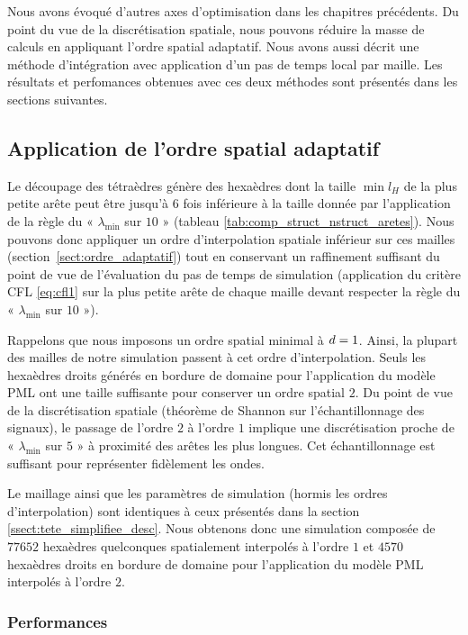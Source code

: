 Nous avons évoqué d'autres axes d'optimisation dans les chapitres précédents.
Du point du vue de la discrétisation spatiale, nous pouvons réduire la masse
de calculs en appliquant l'ordre spatial adaptatif.
Nous avons aussi décrit une méthode d'intégration avec application d'un pas de temps
local par maille.
Les résultats et perfomances obtenues avec ces deux méthodes sont
présentés dans les sections suivantes.



\subsection{Application de l'ordre spatial adaptatif}
\label{ssect:tete_simplifiee_adaptatif}

Le découpage des tétraèdres génère des hexaèdres dont la taille $\min l_H$
de la plus petite arête peut être jusqu'à $6$ fois inférieure à la taille
donnée par l'application de la règle du « $\lambda_{\min}$ sur $10$ »
(tableau \ref{tab:comp_struct_nstruct_aretes}).
Nous pouvons donc appliquer un ordre
d'interpolation spatiale inférieur sur ces mailles (section~\ref{sect:ordre_adaptatif})
tout en conservant
un raffinement suffisant du point de vue de l'évaluation du pas de temps
de simulation (application du critère CFL \eqref{eq:cfl1} sur la plus petite
arête de chaque maille devant respecter la règle du « $\lambda_{\min}$ sur $10$ »).

Rappelons que nous imposons un ordre spatial minimal à $d=1$. Ainsi,
la plupart des mailles de notre simulation passent à cet ordre d'interpolation.
Seuls les hexaèdres droits générés en bordure de domaine pour l'application du modèle PML
ont une taille suffisante pour conserver un ordre spatial $2$.
Du point de vue de la discrétisation spatiale (théorème de Shannon
sur l'échantillonnage des signaux),
le passage de l'ordre $2$ à l'ordre $1$ implique une discrétisation
proche de « $\lambda_{\min}$ sur $5$ » à proximité des arêtes les plus longues.
Cet échantillonnage est suffisant pour représenter fidèlement les ondes.

Le maillage ainsi que les paramètres de simulation (hormis les ordres d'interpolation)
sont identiques à ceux présentés dans la section \ref{ssect:tete_simplifiee_desc}.
Nous obtenons donc une simulation composée de $77652$ hexaèdres quelconques
spatialement interpolés à l'ordre $1$ et $4570$ hexaèdres droits en bordure de domaine
pour l'application du modèle PML interpolés à l'ordre $2$.


\subsubsection{Performances}

